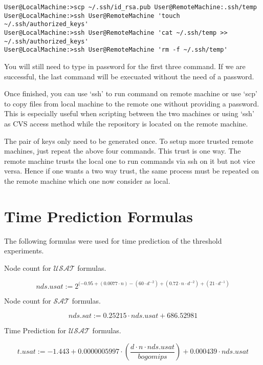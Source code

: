 \documentclass{book}
\begin{document}
\begin{verbatim}
User@LocalMachine:>scp ~/.ssh/id_rsa.pub User@RemoteMachine:.ssh/temp
User@LocalMachine:>ssh User@RemoteMachine 'touch ~/.ssh/authorized_keys'
User@LocalMachine:>ssh User@RemoteMachine 'cat ~/.ssh/temp >> ~/.ssh/authorized_keys'
User@LocalMachine:>ssh User@RemoteMachine 'rm -f ~/.ssh/temp'
\end{verbatim}

You will still need to type in password for the first three command. If we are successful, the last command will be execuated without the need of a password.

Once finished, you can use `ssh' to run command on remote machine or use `scp' to copy files from local machine to the remote one without providing a password. This is especially useful when scripting between the two machines or using `ssh' as CVS access method while the repository is located on the remote machine.

The pair of keys only need to be generated once. To setup more trusted remote machines, just repeat the above four commands. This trust is one way. The remote machine trusts the local one to run commands via ssh on it but not vice versa. Hence if one wants a two way trust, the same process must be repeated on the remote machine which one now consider as local.       

\section{Time Prediction Formulas}
\label{sec:finalreportprediction}

The following formulas were used for time prediction of the threshold experiments.

Node count for $\mathcal{USAT}$ formulas.

\begin{displaymath}
nds.usat := 2^{(-0.95 + (0.0077 \cdot n) - (60 \cdot d^{-2}) + (0.72 \cdot n \cdot d^{-2}) + (21 \cdot d^{-1})}
\end{displaymath}

Node count for $\mathcal{SAT}$ formulas.

\begin{displaymath}
nds.sat := 0.25215 \cdot nds.usat + 686.52981
\end{displaymath}

Time Prediction for $\mathcal{USAT}$ formulas.

\begin{displaymath}
t.usat := -1.443 + 0.0000005997 \cdot (\frac{d \cdot n \cdot nds.usat}{bogomips}) + 0.000439 \cdot nds.usat
\end{displaymath}
\end{document}

